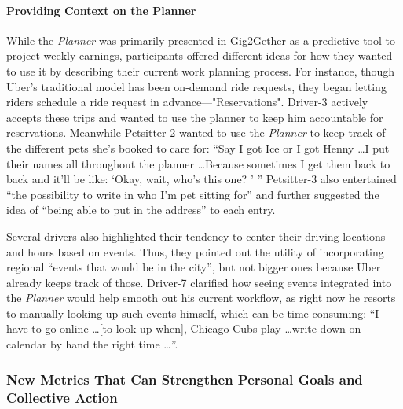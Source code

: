 \paragraph{\textbf{Providing Context on the Planner}} \label{planner_improvements}
{While the \textit{Planner} was primarily presented in Gig2Gether as a predictive tool to project weekly earnings, participants offered different ideas for how they wanted to use it by describing their current work planning process.}
{For instance, though Uber's traditional model has been on-demand ride requests, they began letting riders schedule a ride request in advance---"Reservations". Driver-3 actively accepts these trips and wanted} to use the planner to keep him accountable for reservations. {Meanwhile} Petsitter-2 {wanted to use the \textit{Planner} to keep track of the different pets she's booked to care for}:
``Say I got Ice or I got Henny \dots I put their names all throughout the planner \dots Because sometimes I get them back to back and it'll be like: `Okay, wait, who's this one? ' '' Petsitter-3 also entertained ``the possibility to write in who I'm pet sitting for'' and further suggested the idea of ``being able to put in the address'' to each entry.

{Several drivers also highlighted their tendency to center their driving locations and hours based on events. Thus, they} pointed out the utility of incorporating regional ``events that would be in the city'', but not bigger ones because Uber already keeps track of those. Driver-7 {clarified how seeing events integrated into the \textit{Planner} would help smooth out his current workflow, as right now} he resorts to manually looking up such events himself, which can be time-consuming: ``I have to go online \dots [to look up when], Chicago Cubs play \dots write down on calendar by hand the right time \dots''.

\subsubsection{{New Metrics That Can Strengthen Personal Goals and Collective Action}}
